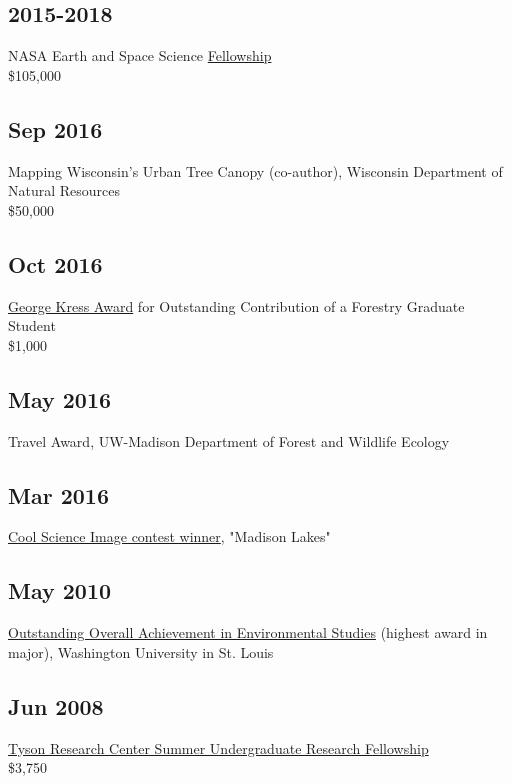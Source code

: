 \documentclass{article}
\begin{document}
\subsection*{2015-2018}
\label{sec:orgb9c4edb}
NASA Earth and Space Science \href{https://nspires.nasaprs.com/external/viewrepositorydocument/cmdocumentid=459947/solicitationId=\%7BB6CDCEA6-8EDD-A48A-FAF8-E588F66661C3\%7D/viewSolicitationDocument=1/NESSF15\%20selections.pdf}{Fellowship}\\
\$105,000

\subsection*{Sep 2016}
\label{sec:orge016c24}
Mapping Wisconsin's Urban Tree Canopy (co-author), Wisconsin
Department of Natural Resources\\
\$50,000

\subsection*{Oct 2016}
\label{sec:orgce079b8}
\href{https://kb.wisc.edu/russell/page.php?id=65402}{George Kress Award} for Outstanding Contribution of a Forestry Graduate
Student \\
\$1,000

\subsection*{May 2016}
\label{sec:orgc165e30}
Travel Award, UW-Madison Department of Forest and Wildlife Ecology\\

\subsection*{Mar 2016}
\label{sec:orgf9cc9b4}
\href{http://news.wisc.edu/cool-science-images-2016/\#\&gid=1\&pid=10}{Cool Science Image contest winner}, "Madison Lakes" \\

\subsection*{May  2010}
\label{sec:org263c1db}
\href{http://enst.wustl.edu/program/awards}{Outstanding Overall Achievement in Environmental Studies} (highest
award in major), Washington University in St. Louis

\subsection*{Jun 2008}
\label{sec:org5bce2a4}
\href{https://tyson.wustl.edu/2008}{Tyson Research Center Summer Undergraduate Research Fellowship} \\
 \$3,750
\end{document}
